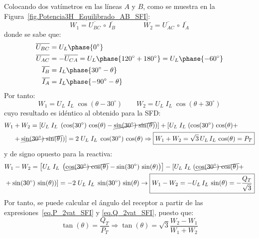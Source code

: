 \documentclass[11pt]{book} %
\begin{document}
	Colocando dos vatímetros en las líneas $A$ y $B$, como se muestra en la Figura~\ref{fig.Potencia3H_Equilibrado_AB_SFI}:
	\begin{equation*}
	    W_1=\overline{U_{BC}}\,\circ\,\overline{I_B}\qquad\qquad W_2=\overline{U_{AC}}\,\circ\,\overline{I_A}
	\end{equation*}
	donde se sabe que:
	\begin{align*}
	    \overline{U_{BC}}&=U_L\phase{0^\circ}\\
	   \overline{U_{AC}}&=-\overline{U_{CA}}=U_L\phase{120^\circ+180^\circ}=U_L\phase{-60^\circ}\\ \overline{I_B}&=I_L\phase{30^\circ-\theta} \\  \overline{I_A}&=I_L\phase{-90^\circ-\theta}
	\end{align*}
	Por tanto: 
	\begin{equation*}
	    W_1=U_L\;I_L\;\cos{(\theta-30^\circ)}\qquad W_2={U_L}\; {I_L}\;\cos{(\theta+30^\circ)}
	\end{equation*}
	cuyo resultado es idéntico al obtenido para la SFD: 
\begin{align}\label{eq.P_2vat_SFI}
    W_1&+W_2=\left[U_L\;I_L\;\left( \cos({30^\circ})\,\cos(\theta) - \cancel{\sin({30^\circ})\,\sin(\theta)}\right) \right] + [U_L\;I_L\;( \cos({30^\circ})\,\cos(\theta) +\nonumber\\
    &+ \cancel{\sin({30^\circ})\,\sin(\theta)}) ]= 2\; U_L\;I_L\;\cos({30^\circ})\,\cos(\theta) \Rightarrow \boxed{W_1 + W_2 = \sqrt{3}\,U_L\, I_L\,\cos(\theta) = P_T}
\end{align}
y de signo opuesto para la reactiva: 
\begin{align}\label{eq.Q_2vat_SFI}
    &W_1-W_2=\left[ U_L\;I_L\;\left( \cancel{\cos({30^\circ})\,\cos(\theta)} - \sin({30^\circ})\,\sin(\theta)\right) \right] - [U_L\;I_L\;( \cancel{\cos({30^\circ})\,\cos(\theta)} +\nonumber\\
    &+\sin({30^\circ})\,\sin(\theta))]= -2\; U_L\;I_L\;\sin({30^\circ})\,\sin(\theta) \rightarrow \boxed{W_1 - W_2 = -U_L\, I_L\,\sin(\theta) = -\dfrac{Q_T}{\sqrt{3}}}
\end{align}
Por tanto, se puede calcular el ángulo del receptor a partir de las expresiones~\eqref{eq.P_2vat_SFI} y \eqref{eq.Q_2vat_SFI}, puesto que:
\begin{equation}
    \tan(\theta) = \dfrac{Q_T}{P_T}\Rightarrow \boxed{\tan(\theta) = \sqrt{3} \frac{W_2 - W_1}{W_1 + W_2}}
\end{equation}
\end{document}
